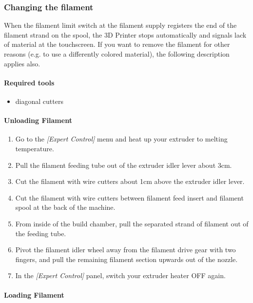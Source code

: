 \subsubsection{Changing the filament} \label{sec:filamentchange}

When the filament limit switch at the filament supply registers the end of the filament strand on the spool, the 3D Printer stops automatically and signals lack of material at the touchscreen.
If you want to remove the filament for other reasons (e.g. to use a differently colored material), the following description applies also.


\paragraph{Required tools}

\begin{itemize}
  \item diagonal cutters
\end{itemize}


\paragraph{Unloading Filament}


\begin{enumerate}
  \item Go to the \emph{[Expert Control]} menu and heat up your extruder to melting temperature.
  \item Pull the filament feeding tube out of the extruder idler lever about 3cm.
  \item Cut the filament with wire cutters about 1cm above the extruder idler lever.
  \item Cut the filament with wire cutters between filament feed insert and
        filament spool at the back of the machine.
  \item From inside of the build chamber, pull the separated strand of filament out of 
        the feeding tube.
  \item Pivot the filament idler wheel away from the filament drive gear with two fingers,
        and pull the remaining filament section upwards out of the nozzle.
  \item In the \emph{[Expert Control]} panel, switch your extruder heater OFF again.
\end{enumerate}


\paragraph{Loading Filament}

